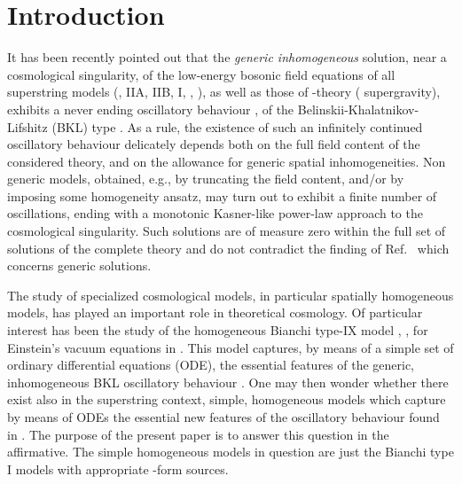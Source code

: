\documentclass[a4paper,12pt]{article}
\begin{document}
\section{Introduction}
It has been recently pointed out that the {\it generic inhomogeneous} 
solution, near a cosmological singularity, of the low-energy 
bosonic field equations of all superstring models (\coordHE{}, IIA, 
IIB, I, \coordHE{}, \coordHE{}), as well as those 
of \coordHE{}-theory (\coordHE{} supergravity), exhibits a never ending 
oscillatory behaviour \cite{dh1}, of the 
Belinskii-Khalatnikov-Lifshitz (BKL) type \cite{BKL}. As a rule, the 
existence of such an infinitely continued oscillatory behaviour 
delicately depends both on the full field content of the considered 
theory, and on the allowance for generic spatial inhomogeneities. Non 
generic models, obtained, e.g., by truncating the field content, 
and/or by imposing some homogeneity ansatz, may turn out to exhibit a 
finite number of oscillations, ending with a monotonic Kasner-like 
power-law approach to the cosmological singularity. Such solutions 
are of measure zero within the full set of solutions of the complete 
theory and do not contradict the finding of Ref.~\cite{dh1} which 
concerns generic solutions. 

The study of 
specialized cosmological models, in particular spatially homogeneous 
models, has played an important role in theoretical cosmology. Of 
particular interest has been the study of the homogeneous Bianchi 
type-IX model \cite{bkl69}, \cite{misner69}, for Einstein's vacuum 
equations in \coordHE{}. This model captures, by means of a simple set of 
ordinary differential equations (ODE), the essential features of the 
generic, inhomogeneous BKL oscillatory behaviour \cite{BKL}.
One may then wonder whether there exist also in the superstring context,
simple, homogeneous models which capture by means of ODEs the
essential new features of the oscillatory behaviour found in
\cite{dh1}.
The purpose of the present paper is to answer this question
in the affirmative.
The simple homogeneous
models in question are just the Bianchi type I models with
appropriate \coordHE{}-form sources.  
\end{document}
